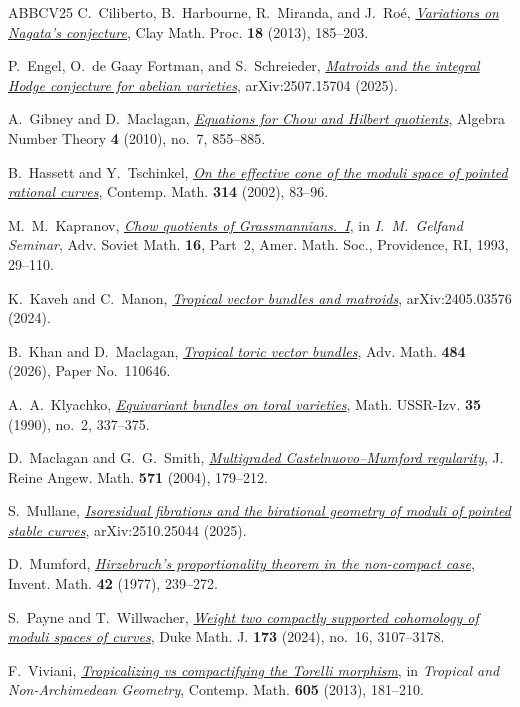 \documentclass[11pt,reqno]{amsart}
\begin{document}
\begin{thebibliography}{ABBCV25}
C.~Ciliberto, B.~Harbourne, R.~Miranda, and J.~Ro\'e,
\emph{\href{https://arxiv.org/abs/1202.0475}{Variations on Nagata's conjecture}},
Clay Math. Proc. \textbf{18} (2013), 185--203.

P.~Engel, O.~de Gaay Fortman, and S.~Schreieder,
\emph{\href{https://arxiv.org/abs/2507.15704}{Matroids and the integral Hodge conjecture for abelian varieties}},
arXiv:2507.15704 (2025).

A.~Gibney and D.~Maclagan,
\emph{\href{https://doi.org/10.2140/ant.2010.4.855}{Equations for Chow and Hilbert quotients}},
Algebra Number Theory \textbf{4} (2010), no.~7, 855--885.

B.~Hassett and Y.~Tschinkel,
\emph{\href{https://arxiv.org/abs/math/0110231}{On the effective cone of the moduli space of pointed rational curves}},
Contemp. Math. \textbf{314} (2002), 83--96.

M.~M.~Kapranov,
\emph{\href{https://doi.org/10.1090/advsov/016.2/02}{Chow quotients of Grassmannians.~I}},
in \emph{I.~M.~Gelfand Seminar},
Adv. Soviet Math. \textbf{16}, Part~2, Amer. Math. Soc., Providence, RI, 1993, 29--110.

K.~Kaveh and C.~Manon,
\emph{\href{https://arxiv.org/abs/2405.03576}{Tropical vector bundles and matroids}},
arXiv:2405.03576 (2024).

B.~Khan and D.~Maclagan,
\emph{\href{https://doi.org/10.1016/j.aim.2025.110646}{Tropical toric vector bundles}},
Adv. Math. \textbf{484} (2026), Paper No.~110646.

A.~A.~Klyachko,
\emph{\href{https://doi.org/10.1070/IM1990v035n02ABEH000707}{Equivariant bundles on toral varieties}},
Math. USSR-Izv. \textbf{35} (1990), no.~2, 337--375.

D.~Maclagan and G.~G.~Smith,
\emph{\href{https://doi.org/10.1515/crll.2004.040}{Multigraded Castelnuovo--Mumford regularity}},
J. Reine Angew. Math. \textbf{571} (2004), 179--212.

S.~Mullane,
\emph{\href{https://arxiv.org/abs/2510.25044}{Isoresidual fibrations and the birational geometry of moduli of pointed stable curves}},
arXiv:2510.25044 (2025).

D.~Mumford,
\emph{\href{https://www.dam.brown.edu/people/mumford/alg_geom/papers/1977b--HirzProp-GT.pdf}{Hirzebruch's proportionality theorem in the non-compact case}},
Invent. Math. \textbf{42} (1977), 239--272.

S.~Payne and T.~Willwacher,
\emph{\href{https://doi.org/10.1215/00127094-2024-0003}{Weight two compactly supported cohomology of moduli spaces of curves}},
Duke Math. J. \textbf{173} (2024), no.~16, 3107--3178.

F.~Viviani,
\emph{\href{https://arxiv.org/abs/1204.3875}{Tropicalizing vs compactifying the Torelli morphism}},
in \emph{Tropical and Non-Archimedean Geometry},
Contemp. Math. \textbf{605} (2013), 181--210.

\end{thebibliography}
\endgroup
\end{document}
